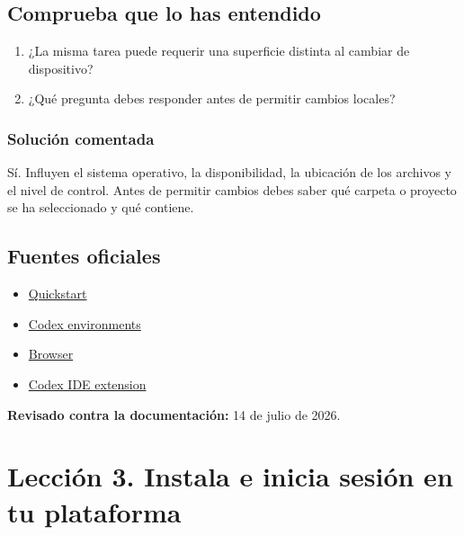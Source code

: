 \documentclass[10pt,a4paper,openany]{book}
\providecommand{\tightlist}{\setlength{\itemsep}{0.18em}\setlength{\parskip}{0pt}}
\begin{document}
\subsection{Comprueba que lo has
entendido}\label{comprueba-que-lo-has-entendido-1}

\begin{enumerate}
\def\labelenumi{\arabic{enumi}.}
\tightlist
\item
  ¿La misma tarea puede requerir una superficie distinta al cambiar de
  dispositivo?
\item
  ¿Qué pregunta debes responder antes de permitir cambios locales?
\end{enumerate}

\subsubsection{Solución comentada}\label{soluciuxf3n-comentada-1}

Sí. Influyen el sistema operativo, la disponibilidad, la ubicación de
los archivos y el nivel de control. Antes de permitir cambios debes
saber qué carpeta o proyecto se ha seleccionado y qué contiene.

\subsection{Fuentes oficiales}\label{fuentes-oficiales-1}

\begin{itemize}
\tightlist
\item
  \href{https://learn.chatgpt.com/docs/quickstart}{Quickstart}
\item
  \href{https://learn.chatgpt.com/docs/environments/modes}{Codex
  environments}
\item
  \href{https://learn.chatgpt.com/docs/browser}{Browser}
\item
  \href{https://learn.chatgpt.com/docs/developer-commands?surface=ide}{Codex
  IDE extension}
\end{itemize}

\textbf{Revisado contra la documentación:} 14 de julio de 2026.

\clearpage

\section{Lección 3. Instala e inicia sesión en tu
plataforma}\label{lecciuxf3n-3.-instala-e-inicia-sesiuxf3n-en-tu-plataforma}
\end{document}

